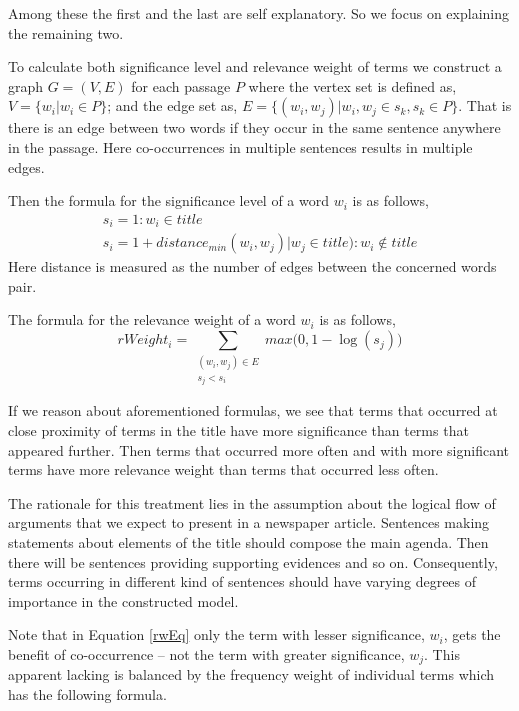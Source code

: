 \documentclass[article]{IEEEtran}
\begin{document}
Among these the first and the last are self explanatory. So we focus on explaining the remaining two.

To calculate both significance level and relevance weight of terms we construct a graph ${G = (V, E)}$ for each passage $P$ where the vertex set is defined as, $V = \{w_i | w_i \in P\}$; and the edge set as, $E = \{(w_i, w_j) | w_i, w_j \in s_k, s_k \in P\}$. That is there is an edge between two words if they occur in the same sentence anywhere in the passage. Here co-occurrences in multiple sentences results in multiple edges. 

Then the formula for the significance level of a word $w_i$ is as follows, 
\begin{equation}
\begin{array}{lr}
s_i = 1 : w_i \in title \\
s_i = 1 + distance_{min}(w_i, w_j) | w_j \in title) : w_i \notin title
\end{array}
\end{equation}
Here distance is measured as the number of edges between the concerned words pair.  

The formula for the relevance weight of a word $w_i$ is as follows, 
\begin{equation}
\label{rwEq}
rWeight_i = \sum_{\substack{(w_i, w_j) \in E\\s_j < s_i}} max\big(0, 1 - \log(s_j)\big)
\end{equation}
 

If we reason about aforementioned formulas, we see that terms that occurred at close proximity of terms in the title have more significance than terms that appeared further. Then terms that occurred more often and with more significant terms have more relevance weight than terms that occurred less often.  

The rationale for this treatment lies in the assumption about the logical flow of arguments that we expect to present in a newspaper article. Sentences making statements about elements of the title should compose the main agenda. Then there will be sentences providing supporting evidences and so on. Consequently, terms occurring in different kind of sentences should have varying degrees of importance in the constructed model.   

Note that in Equation \ref{rwEq} only the term with lesser significance, $w_i$, gets the benefit of co-occurrence -- not the term with greater significance, $w_j$. This apparent lacking is balanced by the frequency weight of individual terms which has the following formula.
\end{document}
